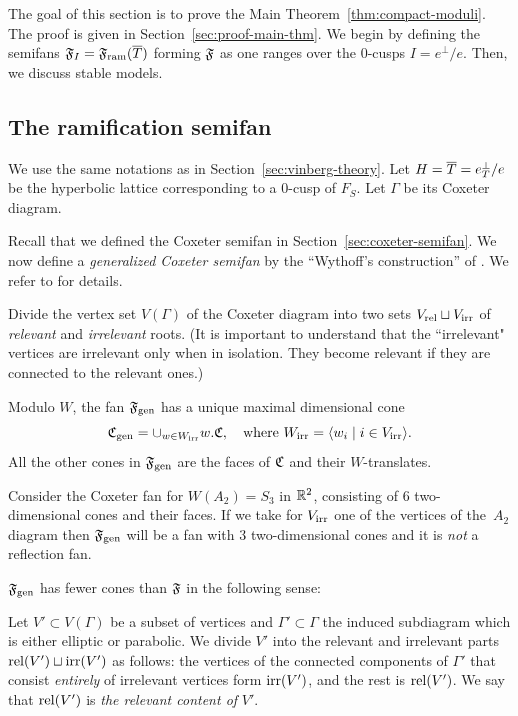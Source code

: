 \documentclass{amsart}
\begin{document}
The goal of this section is to prove the Main
Theorem~\ref{thm:compact-moduli}. The proof is given in
Section~\ref{sec:proof-main-thm}. We begin by defining the semifans
${\mathfrak F}_I = {\mathfrak F}_{\rm ram}({\overline T})$ forming ${\mathfrak F}$ as one ranges over the $0$-cusps
$I = e^\perp/e$. Then, we discuss stable models. 

\subsection{The ramification semifan}
\label{sec:semifan}

We use the same notations as in Section~\ref{sec:vinberg-theory}.  Let
$H={\overline T}=e^\perp_T/e$ be the hyperbolic lattice corresponding to a
$0$-cusp of $F_S$. Let $\Gamma$ be its Coxeter diagram.

Recall that we defined the Coxeter semifan in
Section~\ref{sec:coxeter-semifan}.  We now define a \emph{generalized Coxeter
semifan} by the ``Wythoff's construction'' of
\cite{coxeter1935wythoffs-construction}. We refer to
\cite[Sec.~10C]{alexeev2019stable-pair} for details. 

Divide the vertex set $V(\Gamma)$ of the Coxeter diagram into two
sets $V_{\rm rel}\sqcup V_{\rm irr}$ of {\it relevant} and {\it irrelevant} roots.
(It is important to understand that the ``irrelevant" vertices are
irrelevant only when in isolation. They become relevant if they are
connected to the relevant ones.)

\begin{definition}\label{def:generalized-cox-semifan}
Modulo $W$, the fan ${\mathfrak F}_{\rm gen}$ has a unique maximal dimensional
cone
\begin{displaymath}
  {\mathfrak C}_{\rm gen} = \cup_{w\in W_{\rm irr}} w.{\mathfrak C}, \quad \text{where }
  W_{\rm irr} = \langle w_i \mid i\in V_{\rm irr} \rangle.
\end{displaymath}
All the other cones in ${\mathfrak F}_{\rm gen}$ are the faces of ${\mathfrak C}$ and their
$W$-translates.
\end{definition}

\begin{example}
  Consider the Coxeter fan for $W(A_2)=S_3$ in ${\mathbb R}^2$, consisting of
  $6$ two-dimensional cones and their faces. If we take for $V_{\rm irr}$
  one of the vertices of the~$A_2$ diagram then ${\mathfrak F}_{\rm gen}$ will be a fan
  with $3$ two-dimensional cones and it is \emph{not} a reflection
  fan. 
\end{example}

${\mathfrak F}_{\rm gen}$ has fewer cones than ${\mathfrak F}$ in the following sense:

\begin{definition}
  Let $V'\subset V(\Gamma)$ be a subset of vertices and
  $\Gamma'\subset\Gamma$ the induced subdiagram which is either
  elliptic or parabolic.  We divide $V'$ into the relevant and
  irrelevant parts $\operatorname{rel}(V') \sqcup \operatorname{irr}(V')$ as follows: the
  vertices of the connected components of $\Gamma'$ that consist
  \emph{entirely} of irrelevant vertices form $\operatorname{irr}(V')$, and the
  rest is $\operatorname{rel}(V')$. We say that $\operatorname{rel}(V')$ is \emph{the
    relevant content of} $V'$.
\end{definition}
\end{document}
